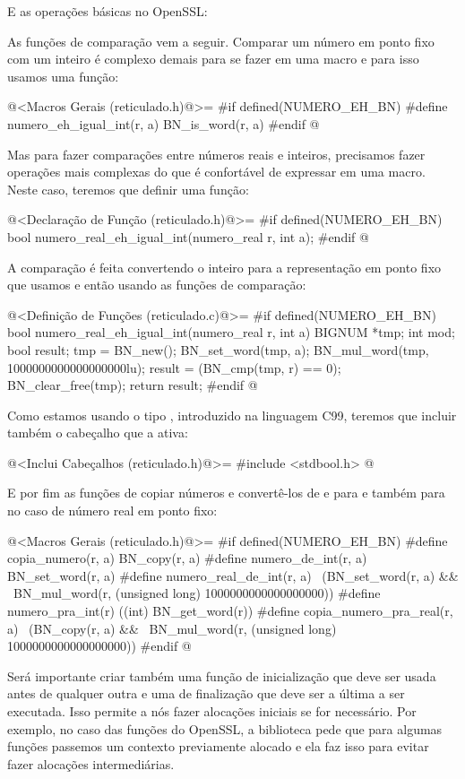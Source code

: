 E as operações básicas no OpenSSL:


As funções de comparação vem a seguir. Comparar um número em ponto
fixo com um inteiro é complexo demais para se fazer em uma macro e
para isso usamos uma função:

\iniciocodigo
@<Macros Gerais (reticulado.h)@>=
#if defined(NUMERO_EH_BN)
#define numero_eh_igual_int(r, a) BN_is_word(r, a)
#endif
@
\fimcodigo

Mas para fazer comparações entre números reais e inteiros, precisamos
fazer operações mais complexas do que é confortável de expressar em
uma macro. Neste caso, teremos que definir uma função:

\iniciocodigo
@<Declaração de Função (reticulado.h)@>=
#if defined(NUMERO_EH_BN)
bool numero_real_eh_igual_int(numero_real r, int a);
#endif
@
\fimcodigo

A comparação é feita convertendo o inteiro para a representação em
ponto fixo que usamos e então usando as funções de comparação:

\iniciocodigo
@<Definição de Funções (reticulado.c)@>=
#if defined(NUMERO_EH_BN)
bool numero_real_eh_igual_int(numero_real r, int a){
  BIGNUM *tmp;
  int mod;
  bool result;
  tmp = BN_new();
  BN_set_word(tmp, a);
  BN_mul_word(tmp, 1000000000000000000lu);
  result = (BN_cmp(tmp, r) == 0);
  BN_clear_free(tmp);
  return result;
}
#endif
@

Como estamos usando o tipo , introduzido na linguagem
C99, teremos que incluir também o cabeçalho que a ativa:

\iniciocodigo
@<Inclui Cabeçalhos (reticulado.h)@>=
#include <stdbool.h>
@
\fimcodigo


E por fim as funções de copiar números e convertê-los de e
para  e também para  no caso de
número real em ponto fixo:

\iniciocodigo
@<Macros Gerais (reticulado.h)@>=
#if defined(NUMERO_EH_BN)
#define copia_numero(r, a) BN_copy(r, a)
#define numero_de_int(r, a) BN_set_word(r, a)
#define numero_real_de_int(r, a) \
          (BN_set_word(r, a) &&  \
           BN_mul_word(r, (unsigned long) 1000000000000000000))
#define numero_pra_int(r) ((int) BN_get_word(r))
#define copia_numero_pra_real(r, a) \
          (BN_copy(r, a) &&         \
          BN_mul_word(r, (unsigned long) 1000000000000000000))
#endif
@
\fimcodigo

Será importante criar também uma função de inicialização que deve ser
usada antes de qualquer outra e uma de finalização que deve ser a
última a ser executada. Isso permite a nós fazer alocações iniciais se
for necessário. Por exemplo, no caso das funções do OpenSSL, a
biblioteca pede que para algumas funções passemos um contexto
previamente alocado e ela faz isso para evitar fazer alocações
intermediárias.

